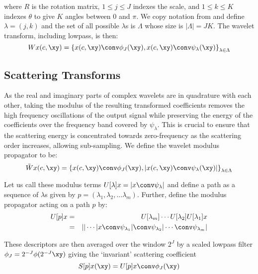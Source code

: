 where $R$ is the rotation matrix, $1 \leq j \leq J$ indexes the scale, and
$1 \leq k \leq K$ indexes $\theta$ to give $K$ angles between $0$ and $\pi$. We
copy notation from \cite{bruna_invariant_2013} and define $\lambda = (j, k)$ and
the set of all possible $\lambda$s is $\Lambda$ whose size is $|\Lambda | = JK$.
The wavelet transform, including lowpass, is then:
%
\begin{equation}
  Wx(c, \xy) = \left\{ x(c, \xy)\conv \phi_J(\xy), x(c, \xy)\conv \psi_\lambda (\xy) \right\}_{\lambda \in \Lambda}
\end{equation}

\subsection{Scattering Transforms}\label{sec:ch5:scatter}
As the real and imaginary parts of complex wavelets are in quadrature with
each other, taking the modulus of the resulting transformed coefficients removes
the high frequency oscillations of the output signal while preserving the energy
of the coefficients over the frequency band covered by $\psi_\lambda$. This is
crucial to ensure that the scattering energy is concentrated towards
zero-frequency as the scattering order increases, allowing sub-sampling.
We define the wavelet modulus propagator to be:
%
\begin{equation}
  \label{eq:ch5:wave_mod}
  \tilde{W}x(c, \xy) = \left\{ x(c, \xy) \conv \phi_{J}(\xy), |x(c, \xy) \conv \psi_\lambda (\xy) | \right\}_{\lambda \in \Lambda} 
\end{equation}

Let us call these modulus terms $U[\lambda] x = \lvert x \conv \psi_\lambda
\rvert$ and define a path as a sequence of $\lambda$s given by $p = \left(\lambda_1,
\lambda_2, \ldots \lambda_m \right)$. Further, define the modulus propagator
acting on a path $p$ by:
%
\begin{eqnarray}
  U[p]x & = & U[\lambda_m] \cdots U[\lambda_2]U[\lambda_1]x \label{eq:ch5:u_paths}\\
        & = & || \cdots | x\conv \psi_{\lambda_1} | \conv \psi_{\lambda_2} | \cdots \conv \psi_{\lambda_m} |
\end{eqnarray}

These descriptors are then averaged over the window $2^J$ by a scaled lowpass filter $\phi_J =
2^{-J}\phi(2^{-J}\xy)$ giving the `invariant' scattering coefficient
%
\begin{equation}
  S[p]x(\xy) = U[p]x \conv \phi_J(\xy)
\end{equation}


